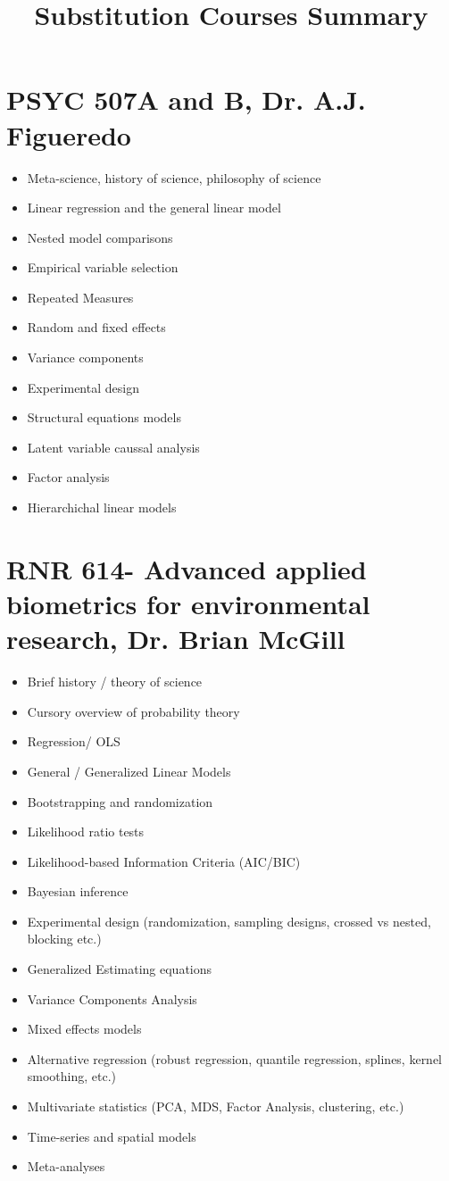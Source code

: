 \documentclass{article}\usepackage[]{graphicx}\usepackage[]{color}
\title{Substitution Courses Summary}
\begin{document}
\maketitle

\section{PSYC 507A and B, Dr. A.J. Figueredo}
\begin{itemize}
\item Meta-science, history of science, philosophy of science
\item Linear regression and the general linear model
\item Nested model comparisons
\item Empirical variable selection
\item Repeated Measures
\item Random and fixed effects
\item Variance components
\item Experimental design
\item Structural equations models
\item Latent variable caussal analysis
\item Factor analysis
\item Hierarchichal linear models
\end{itemize}



\section{RNR 614- Advanced applied biometrics for environmental research, Dr. Brian McGill}
\begin{itemize}
\item Brief history / theory of science
\item Cursory overview of probability theory
\item Regression/ OLS
\item General / Generalized Linear Models
\item Bootstrapping and randomization
\item Likelihood ratio tests
\item Likelihood-based Information Criteria (AIC/BIC)
\item Bayesian inference
\item Experimental design (randomization, sampling designs, crossed vs nested, blocking etc.)
\item Generalized Estimating equations
\item Variance Components Analysis
\item Mixed effects models
\item Alternative regression (robust regression, quantile regression, splines, kernel smoothing, etc.)
\item Multivariate statistics (PCA, MDS, Factor Analysis, clustering, etc.)
\item Time-series and spatial models
\item Meta-analyses
\end{itemize}
\end{document}
